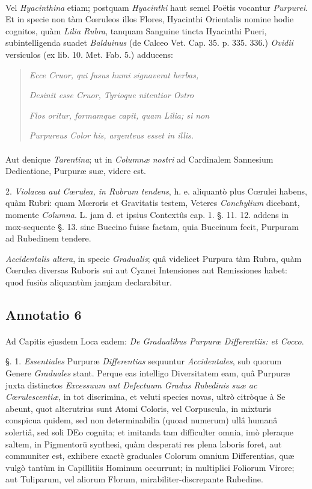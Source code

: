 \documentclass[a4paper, 11pt, oneside, polutonikogreek, german]{article}
\begin{document}
\paragraph{}
Vel \emph{Hyacinthina} etiam; postquam \emph{Hyacinthi} haut semel Poëtis vocantur \emph{Purpurei}. Et in specie non tàm Cœruleos illos Flores, Hyacinthi Orientalis nomine hodie cognitos, quàm \emph{Lilia Rubra}, tanquam Sanguine tincta Hyacinthi Pueri, subintelligenda suadet \emph{Balduinus} (de Calceo Vet. Cap. 35. p. 335. 336.) \emph{Ovidii} versiculos (ex lib. 10. Met. Fab. 5.) adducens:
\begin{quotation}
\emph{Ecce Cruor, qui fusus humi signaverat herbas,}

\emph{Desinit esse Cruor, Tyrioque nitentior Ostro}

\emph{Flos oritur, formamque capit, quam Lilia; si non}

\emph{Purpureus Color his, argenteus esset in illis.}
\end{quotation}
\paragraph{}
Aut denique \emph{Tarentina}; ut in \emph{Columnæ nostri} ad Cardinalem Sannesium Dedicatione, Purpuræ suæ, videre est.

2. \emph{Violacea aut Cœrulea, in Rubrum tendens}, h. e. aliquantò plus Cœrulei habens, quàm Rubri: quam Mœroris et Gravitatis testem, Veteres \emph{Conchylium} dicebant, momente \emph{Columna}. L. jam d. et ipsius Contextûs cap. 1. §. 11. 12. addens in mox-sequente §. 13. sine Buccino fuisse factam, quia Buccinum fecit, Purpuram ad Rubedinem tendere.

\emph{Accidentalis altera}, in specie \emph{Gradualis}; quâ videlicet Purpura tàm Rubra, quàm Cœrulea diversas Ruboris sui aut Cyanei Intensiones aut Remissiones habet: quod fusiùs aliquantùm jamjam declarabitur.

\subsection{Annotatio 6}
\paragraph{}
Ad Capitis ejusdem Loca eadem: \emph{De Gradualibus Purpuræ Differentiis: et Cocco}.

§. 1. \emph{Essentiales} Purpuræ \emph{Differentias} sequuntur \emph{Accidentales}, sub quorum Genere \emph{Graduales} stant. Perque eas intelligo Diversitatem eam, quâ Purpuræ juxta distinctos \emph{Excessuum aut Defectuum Gradus Rubedinis suæ ac Cœrulescentiæ}, in tot discrimina, et veluti species novas, ultrò citròque à Se abeunt, quot alterutrius sunt Atomi Coloris, vel Corpuscula, in mixturis conspicua quidem, sed non determinabilia (quoad numerum) ullâ humanâ solertiâ, sed soli DEo cognita; et imitanda tam difficulter omnia, imò pleraque saltem, in Pigmentorū synthesi, quàm desperati res plena laboris foret, aut communiter est, exhibere exactè graduales Colorum omnium Differentias, quæ vulgò tantùm in Capillitiis Hominum occurrunt; in multiplici Foliorum Virore; aut Tuliparum, vel aliorum Florum, mirabiliter-discrepante Rubedine.
\end{document}
